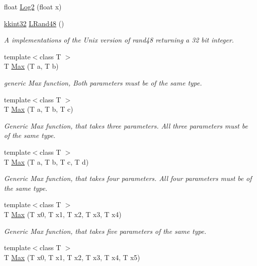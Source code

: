 \begin{DoxyCompactItemize}
\item 
float \hyperlink{namespace_k_k_b_aaf5b662ab451e5b9e4b16c3a3f2e1007}{Log2} (float x)
\item 
\hyperlink{namespace_k_k_b_a8fa4952cc84fda1de4bec1fbdd8d5b1b}{kkint32} \hyperlink{namespace_k_k_b_aad6ec2b84e0888ea95b620ce79b60e40}{L\+Rand48} ()
\begin{DoxyCompactList}\small\item\em A implementations of the Unix version of rand48 returning a 32 bit integer. \end{DoxyCompactList}\item 
{\footnotesize template$<$class T $>$ }\\T \hyperlink{namespace_k_k_b_a25e187e24c091586293725f27f007ad7}{Max} (T a, T b)
\begin{DoxyCompactList}\small\item\em generic Max function, Both parameters must be of the same type. \end{DoxyCompactList}\item 
{\footnotesize template$<$class T $>$ }\\T \hyperlink{namespace_k_k_b_a33da15022f43e40131b8ac9cb04774a1}{Max} (T a, T b, T c)
\begin{DoxyCompactList}\small\item\em Generic Max function, that takes three parameters. All three parameters must be of the same type. \end{DoxyCompactList}\item 
{\footnotesize template$<$class T $>$ }\\T \hyperlink{namespace_k_k_b_a6037d327cea96be9d6de0130a902676b}{Max} (T a, T b, T c, T d)
\begin{DoxyCompactList}\small\item\em Generic Max function, that takes four parameters. All four parameters must be of the same type. \end{DoxyCompactList}\item 
{\footnotesize template$<$class T $>$ }\\T \hyperlink{namespace_k_k_b_aa7e03b3adb90c03720f8d7d436de1874}{Max} (T x0, T x1, T x2, T x3, T x4)
\begin{DoxyCompactList}\small\item\em Generic Max function, that takes five parameters of the same type. \end{DoxyCompactList}\item 
{\footnotesize template$<$class T $>$ }\\T \hyperlink{namespace_k_k_b_a4974f12f116fe7582645ff47fec15c56}{Max} (T x0, T x1, T x2, T x3, T x4, T x5)

\end{DoxyCompactItemize}
